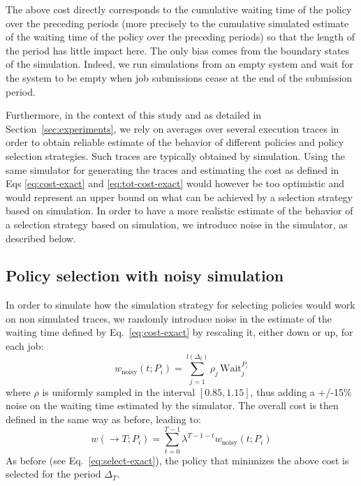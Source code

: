 \documentclass[sigconf,review]{acmart}
\begin{document}
The above cost directly corresponds to the cumulative waiting time of the
policy over the preceding periods (more precisely to the cumulative simulated
estimate of the waiting time of the policy over the preceding periods) so that
the length of the period has little impact here. The only bias comes from the
boundary states of the simulation. Indeed, we run simulations from an empty
system and wait for the system to be empty when job submissions cease at the
end of the submission period.

Furthermore, in the context of this study and as detailed in
Section~\ref{sec:experiments}, we rely on averages over several execution
traces in order to obtain reliable estimate of the behavior of different
policies and policy selection strategies. Such traces are typically obtained by
simulation. Using the same simulator for generating the traces and estimating
the cost as defined in Eqs \ref{eq:cost-exact} and \ref{eq:tot-cost-exact}
would however be too optimistic and would represent an upper bound on what can
be achieved by a selection strategy based on simulation. In order to have a
more realistic estimate of the behavior of a selection strategy based on
simulation, we introduce noise in the simulator, as described below.

\subsection{Policy selection with noisy simulation}
\label{sub:noisy}

In order to simulate how the simulation strategy for selecting policies would
work on non simulated traces, we randomly introduce noise in the estimate of
the waiting time defined by Eq.~\ref{eq:cost-exact} by rescaling it, either
down or up, for each job:
%
\begin{equation} \label{eq:cost-noisy} w_{\mbox{noisy}}(t;P_i) =
\sum_{j=1}^{l(\Delta_t)} \rho_j \, \mbox{Wait}_j^{P_i} \end{equation}
%
where $\rho$ is uniformly sampled in the interval $[0.85,1.15]$, thus adding a
+/-15\% noise on the waiting time estimated by the simulator. The overall cost
is then defined in the same way as before, leading to:
%
\begin{equation} \label{eq:tot-cost-noisy} w(\rightarrow T;P_i) =
\sum_{t=0}^{T-1} \lambda^{T-1-t} w_{\mbox{noisy}}(t;P_i) \end{equation}
%
As before (see Eq.~\ref{eq:select-exact}), the policy that minimizes the above
cost is selected for the period $\Delta_T$.
\end{document}
